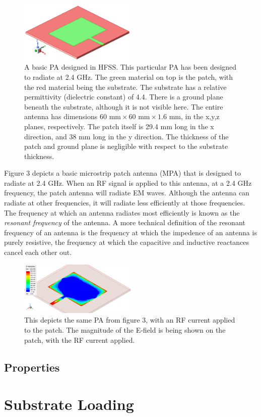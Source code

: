 \documentclass[12pt]{article}
\begin{document}
\begin{figure}[h]
    \centering
    \includegraphics[width=0.5\textwidth]{2.4GHz-basic-pa.png}
    \caption{A basic PA designed in HFSS. This particular PA has been designed to radiate at 2.4 GHz. The green material on top is the patch, with the red material being the substrate. The substrate has a relative permittivity (dielectric constant) of 4.4. There is a ground plane beneath the substrate, although it is not visible here. The entire antenna has dimensions $60 \text{ mm} \times 60 \text{ mm} \times 1.6 \text{ mm}$, in the x,y,z planes, respectively. The patch itself is 29.4 mm long in the x direction, and 38 mm long in the y direction. The thickness of the patch and ground plane is negligible with respect to the substrate thickness. }
\end{figure}

Figure 3 depicts a basic microstrip patch antenna (MPA) that is designed to radiate at 2.4 GHz. When an RF signal is applied to this antenna, at a 2.4 GHz frequency, the patch antenna will radiate EM waves. Although the antenna can radiate at other frequencies, it will radiate less efficiently at those frequencies. The frequency at which an antenna radiates most efficiently is known as the \textit{resonant frequency} of the antenna. A more technical definition of the resonant frequency of an antenna is the frequency at which the impedence of an antenna is purely resistive, the frequency at which the capacitive and inductive reactances cancel each other out. 

\begin{figure}[h]
    \centering
    \includegraphics[width=0.5\textwidth]{basic-patch-antenna-MagE-on-patch.png}
    \caption{This depicts the same PA from figure 3, with an RF current applied to the patch. The magnitude of the E-field is being shown on the patch, with the RF current applied.}
\end{figure}

\subsection{Properties}

\section{Substrate Loading}

\newpage


\end{document}
